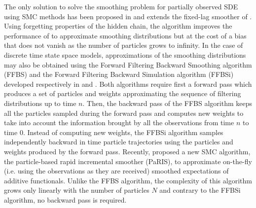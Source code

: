 \documentclass[12pt]{article}
\newcommand{\1}{\mathrm{1}}
\begin{document}
 The only solution to solve the smoothing problem for partially observed SDE using SMC methods has been proposed in \cite{olsson:strojby:2011} and extends the fixed-lag smoother of \cite{olsson:cappe:douc:moulines:2008}. 
 Using forgetting properties of the hidden chain, the algorithm improves the performance of \cite{fearnhead:papaspiliopoulos:roberts:2008} to approximate smoothing distributions but at the cost of a bias that does not vanish as the number of particles grows to infinity.
In the case of discrete time state space models, approximations of the smoothing distributions may also be obtained using the Forward Filtering Backward Smoothing algorithm (FFBS) and  the Forward Filtering Backward Simulation algorithm (FFBSi) developed respectively in \cite{kitagawa:1996,huerzeler:kunsch:1998,doucet:godsill:andrieu:2000} and \cite{godsill:doucet:west:2004}. 
Both algorithms require first a forward pass which produces a set of particles and weights approximating the sequence of filtering distributions up to time $n$. 
Then, the backward pass of the FFBS algorithm keeps all the particles sampled during the forward pass and computes new weights to take into account the information brought by all the observations from time $n$ to time $0$. Instead of computing new weights, the FFBSi  algorithm samples independently backward in time particle trajectories using the particles and weights produced by the forward pass. 
Recently, \cite{olsson:westerborn:2016} proposed a new SMC algorithm, the particle-based rapid incremental smoother (PaRIS), to approximate on-the-fly (i.e. using the observations as they are received) smoothed expectations of additive functionals. 
Unlike the FFBS algorithm, the complexity of this algorithm grows only linearly with the number of particles $N$ and contrary to the FFBSi algorithm, no backward pass is required. 
\end{document}
